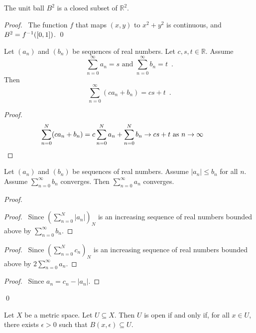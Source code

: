 \begin{cor}
The unit ball $B^2$ is a closed subset of $\mathbb{R}^2$.
\end{cor}

\begin{proof}
\pf\ The function $f$ that maps $(x,y)$ to $x^2 + y^2$ is continuous, and $B^2 = \inv{f}([0,1])$. \qed
\end{proof}

\begin{prop}
Let $(a_n)$ and $(b_n)$ be sequences of real numbers. Let $c,s,t \in \mathbb{R}$. Assume
\[ \sum_{n=0}^\infty a_n = s \text{ and } \sum_{n=0}^\infty b_n = t \enspace . \]
Then
\[ \sum_{n=0}^\infty (c a_n + b_n) = cs + t \enspace . \]
\end{prop}

\begin{proof}
\pf
\[ \sum_{n=0}^N (c a_n + b_n) = c \sum_{n=0}^N a_n + \sum_{n=0}^N b_n \rightarrow cs + t \text{ as } n \rightarrow \infty \qquad \qed \]
\end{proof}

\begin{prop}
Let $(a_n)$ and $(b_n)$ be sequences of real numbers. Assume $|a_n| \leq b_n$ for all $n$. Assume $\sum_{n=0}^\infty b_n$ converges. Then $\sum_{n=0}^\infty a_n$ converges.
\end{prop}

\begin{proof}
\pf
{}
\begin{proof}
	\pf\ Since $(\sum_{n=0}^N |a_n|)_N$ is an increasing sequence of real numbers bounded above by $\sum_{n=0}^\infty b_n$.
\end{proof}
\begin{proof}
	\pf\ Since $(\sum_{n=0}^N c_n)_N$ is an increasing sequence of real numbers bounded above by $2 \sum_{n=0}^\infty a_n$.
\end{proof}
\begin{proof}
	\pf\ Since $a_n = c_n - |a_n|$.
\end{proof}
\qed
\end{proof}

\begin{prop}
\label{prop:metric_open}
Let $X$ be a metric space. Let $U \subseteq X$. Then $U$ is open if and only if, for all $x \in U$, there exists $\epsilon > 0$ such that $B(x, \epsilon) \subseteq U$.
\end{prop}

